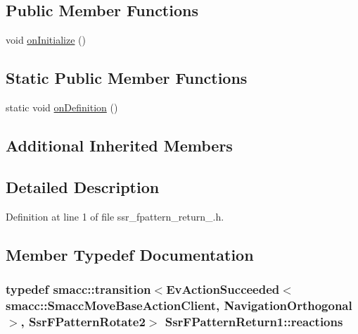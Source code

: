 \subsection*{Public Member Functions}
\begin{DoxyCompactItemize}
\item 
void \hyperlink{structSsrFPatternReturn1_acce01589edd211023478e946a070851a}{on\+Initialize} ()
\end{DoxyCompactItemize}
\subsection*{Static Public Member Functions}
\begin{DoxyCompactItemize}
\item 
static void \hyperlink{structSsrFPatternReturn1_a33764ba1bba88bee311bcb7e62992405}{on\+Definition} ()
\end{DoxyCompactItemize}
\subsection*{Additional Inherited Members}


\subsection{Detailed Description}


Definition at line 1 of file ssr\+\_\+fpattern\+\_\+return\+\_.\+h.



\subsection{Member Typedef Documentation}
\subsubsection[{\texorpdfstring{reactions}{reactions}}]{\setlength{\rightskip}{0pt plus 5cm}typedef {\bf smacc\+::transition}$<$Ev\+Action\+Succeeded$<${\bf smacc\+::\+Smacc\+Move\+Base\+Action\+Client}, {\bf Navigation\+Orthogonal}$>$, {\bf Ssr\+F\+Pattern\+Rotate2}$>$ {\bf Ssr\+F\+Pattern\+Return1\+::reactions}}\hypertarget{structSsrFPatternReturn1_a81c1b84527bc40fc910c7327df687650}{}\label{structSsrFPatternReturn1_a81c1b84527bc40fc910c7327df687650}


